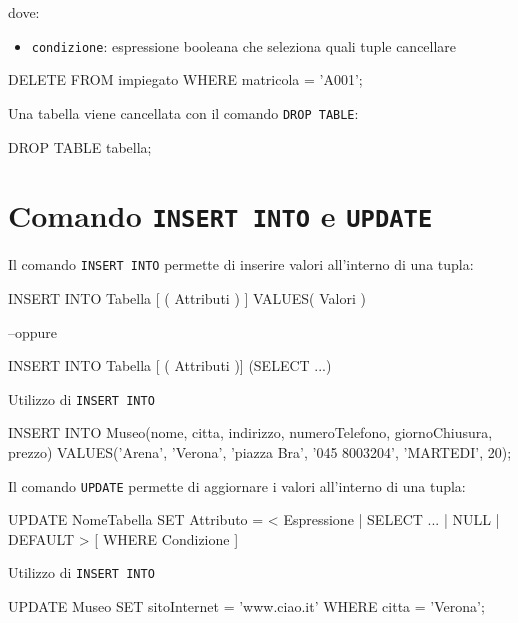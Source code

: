 dove:
\begin{itemize}[label=$\triangleright$, itemsep=\smallskipamount]
  \item \texttt{condizione}: espressione booleana che seleziona quali tuple cancellare
\end{itemize}

\begin{codiceSQL}
DELETE FROM impiegato WHERE matricola = 'A001';
\end{codiceSQL}

\bigskip
Una tabella viene cancellata con il comando \texttt{DROP TABLE}:
\begin{codiceSQL}
  DROP TABLE tabella;
\end{codiceSQL}

\section{Comando \texttt{INSERT INTO} e \texttt{UPDATE}}
Il comando \texttt{INSERT INTO} permette di inserire valori all'interno di una tupla:
\begin{codiceSQL}
INSERT INTO Tabella [ ( Attributi ) ] 
VALUES( Valori )

--oppure

INSERT INTO Tabella [ ( Attributi )]
(SELECT ...)
\end{codiceSQL}

\begin{esempiobox}{Utilizzo di \texttt{INSERT INTO}}
\begin{codiceSQL}
INSERT INTO Museo(nome, citta, indirizzo, numeroTelefono, giornoChiusura, prezzo)
VALUES('Arena', 'Verona', 'piazza Bra', '045 8003204', 'MARTEDI', 20);
\end{codiceSQL}
\end{esempiobox}

\bigskip
Il comando \texttt{UPDATE} permette di aggiornare i valori all'interno di una tupla:
\begin{codiceSQL}
UPDATE NomeTabella
SET Attributo = < Espressione | SELECT ... | NULL | DEFAULT >
[ WHERE Condizione ]
\end{codiceSQL}

\begin{esempiobox}{Utilizzo di \texttt{INSERT INTO}}
\begin{codiceSQL}
UPDATE Museo SET sitoInternet = 'www.ciao.it' 
WHERE citta = 'Verona';  
\end{codiceSQL}
\end{esempiobox}


